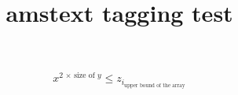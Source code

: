 \documentclass{article}
\title{amstext tagging test}
\begin{document}
\[
   x^{2\,\times\,\text{size of $y$}}
   \leq
   z_{i_{\text{upper bound of the array}}}
\]

\end{document}
